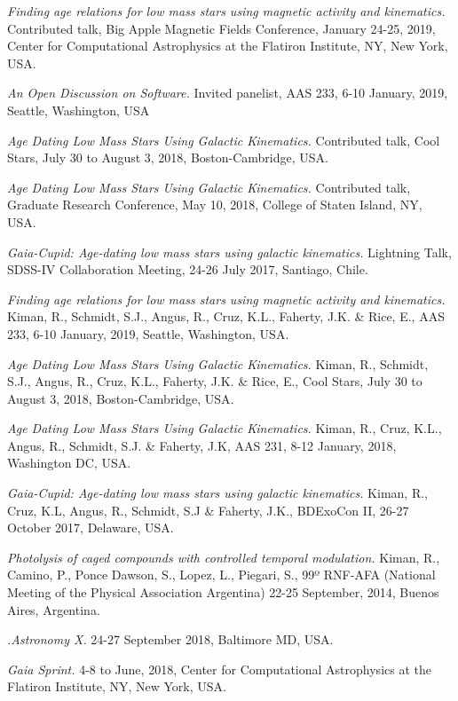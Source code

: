 \documentclass[10pt]{cv}
\begin{document}
\begin{llist}
\textit{Finding age relations for low mass stars using magnetic activity and kinematics.} Contributed talk, Big Apple Magnetic Fields Conference, January 24-25, 2019, Center for Computational Astrophysics at the Flatiron Institute, NY, New York, USA. 

\textit{An Open Discussion on Software.} Invited panelist, AAS 233, 6-10 January, 2019, Seattle, Washington, USA

\textit{Age Dating Low Mass Stars Using Galactic Kinematics.} Contributed talk, Cool Stars, July 30 to August 3, 2018, Boston-Cambridge, USA.

\textit{Age Dating Low Mass Stars Using Galactic Kinematics.} Contributed talk, Graduate Research Conference, May 10, 2018, College of Staten Island, NY, USA.

\textit{Gaia-Cupid: Age-dating low mass stars using galactic kinematics.} Lightning Talk, SDSS-IV Collaboration Meeting, 24-26 July 2017, Santiago, Chile. 


\textit{Finding age relations for low mass stars using magnetic activity and kinematics.} Kiman, R., Schmidt, S.J., Angus, R., Cruz, K.L., Faherty, J.K. \& Rice, E., AAS 233, 6-10 January, 2019, Seattle, Washington, USA.

\textit{Age Dating Low Mass Stars Using Galactic Kinematics.} Kiman, R., Schmidt, S.J., Angus, R., Cruz, K.L., Faherty, J.K. \& Rice, E., Cool Stars, July 30 to August 3, 2018, Boston-Cambridge, USA.

\textit{Age Dating Low Mass Stars Using Galactic Kinematics.} Kiman, R., Cruz, K.L., Angus, R., Schmidt, S.J. \& Faherty, J.K, AAS 231, 8-12 January, 2018, Washington DC, USA. 

\textit{Gaia-Cupid: Age-dating low mass stars using galactic kinematics.} Kiman, R., Cruz, K.L, Angus, R., Schmidt, S.J \& Faherty, J.K., BDExoCon II, 26-27 October 2017, Delaware, USA. 

\textit{Photolysis of caged compounds with controlled temporal modulation.} Kiman, R., Camino, P., Ponce Dawson, S., Lopez, L., Piegari, S., 99º RNF-AFA (National Meeting of the Physical Association Argentina) 22-25 September, 2014, Buenos Aires, Argentina.


\textit{.Astronomy X.} 24-27 September 2018, Baltimore MD, USA.

\textit{Gaia Sprint.} 4-8 to June, 2018, Center for Computational Astrophysics at the Flatiron Institute, NY, New York, USA.


\end{llist}
\end{document}
